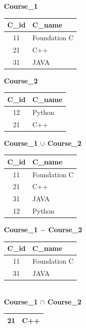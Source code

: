 \documentclass[10pt,a4paper]{article}
\begin{document}
\begin{exbox}
\small
\begin{minipage}[t]{0.23\linewidth}\centering
\textbf{Course\_1}\\[1pt]
\begin{tabular}{cl}\toprule C\_id & C\_name\\\midrule 11 & Foundation C\\ 21 & C++\\ 31 & JAVA\\\bottomrule\end{tabular}
\end{minipage}\hfill
\begin{minipage}[t]{0.2\linewidth}\centering
\textbf{Course\_2}\\[1pt]
\begin{tabular}{cl}\toprule C\_id & C\_name\\\midrule 12 & Python\\ 21 & C++\\\bottomrule\end{tabular}
\end{minipage}\hfill
\begin{minipage}[t]{0.23\linewidth}\centering
\textbf{Course\_1 $\cup$ Course\_2}\\[1pt]
\begin{tabular}{cl}\toprule C\_id & C\_name\\\midrule 11 & Foundation C\\ 21 & C++\\ 31 & JAVA\\ 12 & Python\\\bottomrule\end{tabular}
\end{minipage}\hfill
\begin{minipage}[t]{0.23\linewidth}\centering
\textbf{Course\_1 $-$ Course\_2}\\[1pt]
\begin{tabular}{cl}\toprule C\_id & C\_name\\\midrule 11 & Foundation C\\ 31 & JAVA\\\bottomrule\end{tabular}\\[3pt]
\textbf{Course\_1 $\cap$ Course\_2}\\[1pt]
\begin{tabular}{cl}\toprule 21 & C++\\\bottomrule\end{tabular}
\end{minipage}


\end{exbox}
\end{document}
